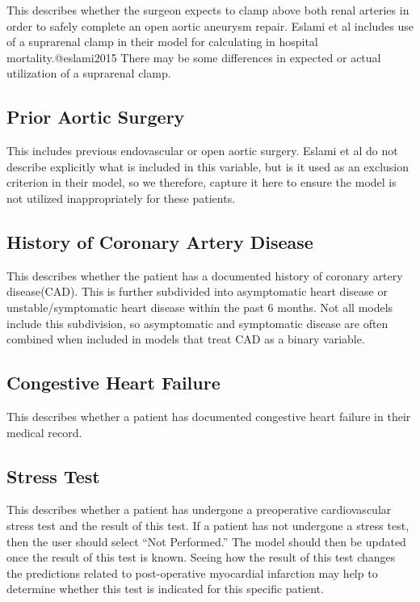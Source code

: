 \documentclass[
]{book}
\begin{document}
This describes whether the surgeon expects to clamp above both renal arteries in order to safely complete an open aortic aneurysm repair. Eslami et al includes use of a suprarenal clamp in their model for calculating in hospital mortality.@eslami2015 There may be some differences in expected or actual utilization of a suprarenal clamp.

\hypertarget{prior-aortic-surgery}{%
\subsection{Prior Aortic Surgery}\label{prior-aortic-surgery}}

This includes previous endovascular or open aortic surgery. Eslami et al do not describe explicitly what is included in this variable, but is it used as an exclusion criterion in their model, so we therefore, capture it here to ensure the model is not utilized inappropriately for these patients. \citet{eslami2015}

\hypertarget{history-of-coronary-artery-disease}{%
\subsection{History of Coronary Artery Disease}\label{history-of-coronary-artery-disease}}

This describes whether the patient has a documented history of coronary artery disease(CAD). This is further subdivided into asymptomatic heart disease or unstable/symptomatic heart disease within the past 6 months. Not all models include this subdivision, so asymptomatic and symptomatic disease are often combined when included in models that treat CAD as a binary variable.

\hypertarget{congestive-heart-failure}{%
\subsection{Congestive Heart Failure}\label{congestive-heart-failure}}

This describes whether a patient has documented congestive heart failure in their medical record.

\hypertarget{stress-test}{%
\subsection{Stress Test}\label{stress-test}}

This describes whether a patient has undergone a preoperative cardiovascular stress test and the result of this test. If a patient has not undergone a stress test, then the user should select ``Not Performed.'' The model should then be updated once the result of this test is known. Seeing how the result of this test changes the predictions related to post-operative myocardial infarction may help to determine whether this test is indicated for this specific patient.
\end{document}
